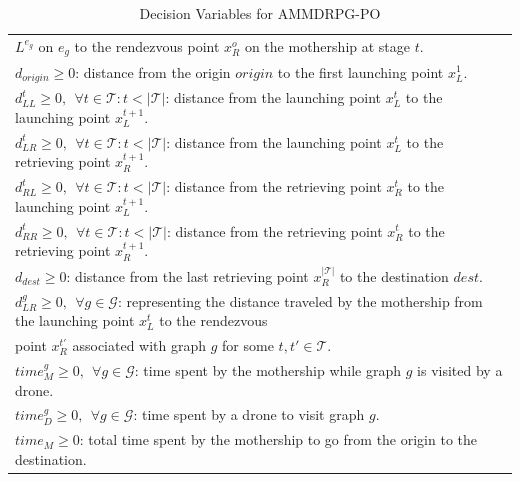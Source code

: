 \documentclass[10pt,a4paper]{elsarticle}
\begin{document}
\begin{table}[h!]
\begin{tabular}{|l|}
\hspace*{1cm} $L^{e_g}$ on $e_g$ to the rendezvous point $x_R^o$ on the mothership at stage $t$.\\
$d_{origin}\geq 0$: distance from the origin $origin$ to the first launching point $x_L^1$.\\
$d_{LL}^t\geq 0, \:\: \forall t \in \mathcal T:t<|\mathcal T|$: distance from the launching point $x_L^t$ to the launching point $x_L^{t+1}$.\\
$d_{LR}^t\geq 0, \:\: \forall t \in \mathcal T:t<|\mathcal T|$: distance from the launching point $x_L^t$ to the retrieving point $x_R^{t+1}$.\\
$d_{RL}^t\geq 0, \:\: \forall t \in \mathcal T:t<|\mathcal T|$: distance from the retrieving point $x_R^t$ to the launching point $x_L^{t+1}$.\\
$d_{RR}^t\geq 0, \:\: \forall t \in \mathcal T:t<|\mathcal T|$: distance from the retrieving point $x_R^t$ to the retrieving point $x_R^{t+1}$.\\
$d_{dest}\geq 0$: distance from the last retrieving point $x_R^{|\mathcal T|}$ to the destination $dest$.\\
$d_{LR}^g\geq 0, \:\: \forall g \in\mathcal G$: representing the distance traveled by the mothership from the launching point $x_L^t$ to the rendezvous\\
\hspace*{1cm} point $x_R^{t'}$ associated with graph $g$ for some $t, t' \in \mathcal T$.\\

$time_M^g \geq 0, \:\: \forall g \in \mathcal G$: time spent by the mothership while graph $g$ is visited by a drone.\\
$time_D^g \geq 0, \:\: \forall g \in \mathcal G$: time spent by a drone to visit graph $g$.\\  
$time_M \geq 0$: total time spent by the mothership to go from the origin to the destination.\\
\hline
\end{tabular}
\caption{Decision Variables for AMMDRPG-PO}
\label{table:t3}
\end{table}
\end{document}
